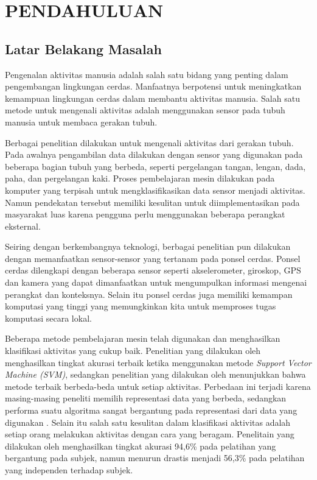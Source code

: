 \chapter{PENDAHULUAN}

\section{Latar Belakang Masalah}
Pengenalan aktivitas manusia adalah salah satu bidang yang penting dalam pengembangan lingkungan cerdas. Manfaatnya berpotensi untuk meningkatkan kemampuan lingkungan cerdas dalam membantu aktivitas manusia. Salah satu metode untuk mengenali aktivitas adalah menggunakan sensor pada tubuh manusia untuk membaca gerakan tubuh.

Berbagai penelitian dilakukan untuk mengenali aktivitas dari gerakan tubuh. Pada awalnya pengambilan data dilakukan dengan sensor yang digunakan pada beberapa bagian tubuh yang berbeda, seperti pergelangan tangan, lengan, dada, paha, dan pergelangan kaki. Proses pembelajaran mesin dilakukan pada komputer yang terpisah untuk mengklasifikasikan data sensor menjadi aktivitas. Namun pendekatan tersebut memiliki kesulitan untuk diimplementasikan pada masyarakat luas karena pengguna perlu menggunakan beberapa perangkat eksternal.

Seiring dengan berkembangnya teknologi, berbagai penelitian pun dilakukan dengan memanfaatkan sensor-sensor yang tertanam pada ponsel cerdas. Ponsel cerdas dilengkapi dengan beberapa sensor seperti akselerometer, giroskop, GPS dan kamera yang dapat dimanfaatkan untuk mengumpulkan informasi mengenai perangkat dan konteksnya. Selain itu ponsel cerdas juga memiliki kemampan komputasi yang tinggi yang memungkinkan kita untuk memproses tugas komputasi secara lokal.

Beberapa metode pembelajaran mesin telah digunakan dan menghasilkan klasifikasi aktivitas yang cukup baik. Penelitian yang dilakukan oleh \Textcite{Chiang-201413} menghasilkan tingkat akurasi terbaik ketika menggunakan metode \textit{Support Vector Machine (SVM)}, sedangkan penelitian yang dilakukan oleh \Textcite{shoaib-2013} menunjukkan bahwa metode terbaik berbeda-beda untuk setiap aktivitas. Perbedaan ini terjadi karena masing-masing peneliti memilih representasi data yang berbeda, sedangkan performa suatu algoritma sangat bergantung pada representasi dari data yang digunakan \Parencite{Goodfellow-2016}. Selain itu salah satu kesulitan dalam klasifikasi aktivitas adalah setiap orang melakukan aktivitas dengan cara yang beragam. Penelitain yang dilakukan oleh \Textcite{tapia-2007} menghasilkan tingkat akurasi 94,6\% pada pelatihan yang bergantung pada subjek, namun menurun drastis menjadi 56,3\% pada pelatihan yang independen terhadap subjek.

